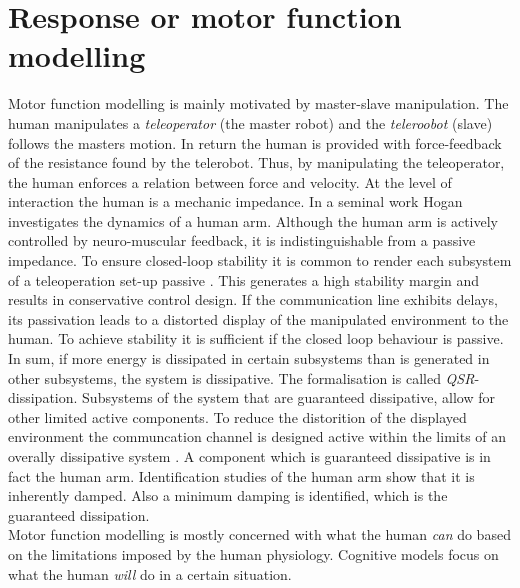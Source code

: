 \documentclass[a4paper,twoside, openright,12pt]{report}
\begin{document}
\section{Response or motor function modelling}
Motor function modelling is mainly motivated by master-slave manipulation. The human manipulates a \emph{teleoperator} (the master robot) and the \emph{teleroobot} (slave) follows the masters motion. In return the human is provided with force-feedback of the resistance found by the telerobot. Thus, by manipulating the teleoperator, the human enforces a relation between force and velocity. At the level of interaction the human is a mechanic impedance. In a seminal work Hogan \cite{Hogan_89} investigates the dynamics of a human arm. Although the human arm is actively controlled by neuro-muscular feedback, it is indistinguishable from a passive impedance. To ensure closed-loop stability it is common to render each subsystem of a teleoperation set-up passive \cite{Niemayer_04}. This generates a high stability margin and results in conservative control design. If the communication line exhibits delays, its passivation leads to a distorted display of the manipulated environment to the human. To achieve stability it is sufficient if the closed loop behaviour is passive. In sum, if more energy is dissipated in certain subsystems than is generated in other subsystems, the system is dissipative. The formalisation is called \emph{QSR}-dissipation. Subsystems of the system that are guaranteed dissipative, allow for other limited active components. To reduce the distorition of the displayed environment the communcation channel is designed active within the limits of an overally dissipative system \cite{Hirche_12}. A component which is guaranteed  dissipative is in fact the human arm.  Identification studies \cite{Rahman99} of the human arm show that it is inherently damped. Also a minimum damping is identified, which is the guaranteed dissipation.\\
Motor function modelling is mostly concerned with what the human \emph{can} do based on the limitations imposed by the human physiology. Cognitive models focus on what the human \emph{will} do in a certain situation. 
\end{document}
